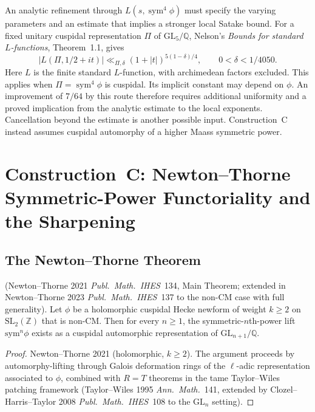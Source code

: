 \begin{remark}
\label{v4-arith:w10-c:rem:sym4-sharpness}
An analytic refinement through
\(L(s,\operatorname{sym}^{4}\phi)\) must specify the varying
parameters and an estimate that implies a stronger local Satake bound.
For a fixed unitary cuspidal representation \(\Pi\) of
\(\mathrm{GL}_{5}/\mathbb Q\), Nelson's
\emph{Bounds for standard \(L\)-functions}, Theorem~1.1, gives
\[
|L(\Pi,1/2+it)|\ll_{\Pi,\delta}
(1+|t|)^{5(1-\delta)/4},\qquad 0<\delta<1/4050.
\]
Here \(L\) is the finite standard \(L\)-function, with archimedean factors excluded.
This applies when \(\Pi=\operatorname{sym}^{4}\phi\) is cuspidal.
Its implicit constant may depend on \(\phi\).
An improvement of \(7/64\) by this route therefore requires
additional uniformity and a proved implication from the analytic
estimate to the local exponents. Cancellation beyond the estimate
is another possible input. Construction~C instead assumes
cuspidal automorphy of a higher Maass symmetric power.
\end{remark}

\section{Construction~C: Newton--Thorne Symmetric-Power Functoriality and the Sharpening}
\label{v4-arith:w10-c:construction-C}

\subsection{The Newton--Thorne Theorem}
\label{v4-arith:w10-c:construction-C:NT}

\begin{theorem}
\label{v4-arith:w10-c:thm:newton-thorne}
\ClaimStatusProvedElsewhere (Newton--Thorne 2021 \emph{Publ.~Math.~IHES}~134,
Main Theorem; extended in Newton--Thorne 2023
\emph{Publ.~Math.~IHES}~137 to the non-CM case with full generality).
Let \(\phi\) be a holomorphic cuspidal Hecke newform of weight \(k\geq 2\)
on \(\mathrm{SL}_{2}(\mathbb{Z})\) that is non-CM. Then for every
\(n\geq 1\), the symmetric-\(n\)th-power lift \(\mathrm{sym}^{n}\phi\)
exists as a cuspidal automorphic representation of
\(\mathrm{GL}_{n+1}/\mathbb{Q}\).
\end{theorem}

\begin{proof}
Newton--Thorne 2021 (holomorphic, \(k\geq 2\)). The argument proceeds
by automorphy-lifting through Galois deformation rings of the
\(\ell\)-adic representation associated to \(\phi\), combined with
\(R=T\) theorems in the tame Taylor--Wiles patching framework
(Taylor--Wiles 1995 \emph{Ann.~Math.}~141, extended by
Clozel--Harris--Taylor 2008 \emph{Publ.~Math.~IHES}~108 to the
\(\mathrm{GL}_{n}\) setting).
\end{proof}

